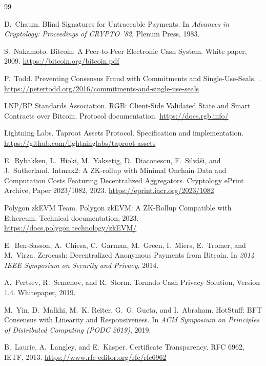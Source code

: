 \begin{thebibliography}{99}

D.~Chaum.
\newblock Blind Signatures for Untraceable Payments.
\newblock In \emph{Advances in Cryptology: Proceedings of CRYPTO '82}, Plenum Press, 1983.

S.~Nakamoto.
\newblock Bitcoin: A Peer-to-Peer Electronic Cash System.
\newblock White paper, 2009. \url{https://bitcoin.org/bitcoin.pdf}

P.~Todd.
\newblock Preventing Consensus Fraud with Commitments and Single-Use-Seals.
. \url{https://petertodd.org/2016/commitments-and-single-use-seals}

LNP/BP Standards Association.
\newblock RGB: Client-Side Validated State and Smart Contracts over Bitcoin.
\newblock Protocol documentation. \url{https://docs.rgb.info/}

Lightning Labs.
\newblock Taproot Assets Protocol.
\newblock Specification and implementation. \url{https://github.com/lightninglabs/taproot-assets}

E.~Rybakken, L.~Hioki, M.~Yaksetig, D.~Diaconescu, F.~Silv\'a\v{s}i, and J.~Sutherland.
\newblock Intmax2: A ZK-rollup with Minimal Onchain Data and Computation Costs Featuring Decentralized Aggregators.
\newblock Cryptology ePrint Archive, Paper 2023/1082, 2023. \url{https://eprint.iacr.org/2023/1082}

Polygon zkEVM Team.
\newblock Polygon zkEVM: A ZK-Rollup Compatible with Ethereum.
\newblock Technical documentation, 2023. \url{https://docs.polygon.technology/zkEVM/}

E.~Ben-Sasson, A.~Chiesa, C.~Garman, M.~Green, I.~Miers, E.~Tromer, and M.~Virza.
\newblock Zerocash: Decentralized Anonymous Payments from Bitcoin.
\newblock In \emph{2014 IEEE Symposium on Security and Privacy}, 2014.

A.~Pertsev, R.~Semenov, and R.~Storm.
\newblock Tornado Cash Privacy Solution, Version 1.4.
\newblock Whitepaper, 2019.

M.~Yin, D.~Malkhi, M.~K. Reiter, G.~G. Gueta, and I.~Abraham.
\newblock HotStuff: BFT Consensus with Linearity and Responsiveness.
\newblock In \emph{ACM Symposium on Principles of Distributed Computing (PODC 2019)}, 2019.

B.~Laurie, A.~Langley, and E.~K\"asper.
\newblock Certificate Transparency.
\newblock RFC 6962, IETF, 2013. \url{https://www.rfc-editor.org/rfc/rfc6962}


\end{thebibliography}

